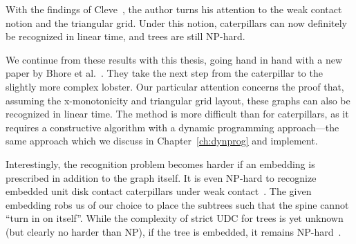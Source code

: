 With the findings of Cleve~\cite{Cleve2020}, the author turns his attention to the weak contact notion and the triangular grid. Under this notion, caterpillars can now definitely be recognized in linear time, and trees are still NP-hard.

We continue from these results with this thesis, going hand in hand with a new paper by Bhore et al.~\cite{Bhore2021}. They take the next step from the caterpillar to the slightly more complex lobster. Our particular attention concerns the proof that, assuming the x-monotonicity and triangular grid layout, these graphs can also be recognized in linear time. The method is more difficult than for caterpillars, as it requires a constructive algorithm with a dynamic programming approach---the same approach which we discuss in Chapter~\ref{ch:dynprog} and implement.

Interestingly, the recognition problem becomes harder if an embedding is prescribed in addition to the graph itself. It is even NP-hard to recognize embedded unit disk contact caterpillars under weak contact~\cite{Chiu2019}. The given embedding robs us of our choice to place the subtrees such that the spine cannot ``turn in on itself''. While the complexity of strict UDC for trees is yet unknown (but clearly no harder than NP), if the tree is embedded, it remains NP-hard~\cite{Bowen2015}.
